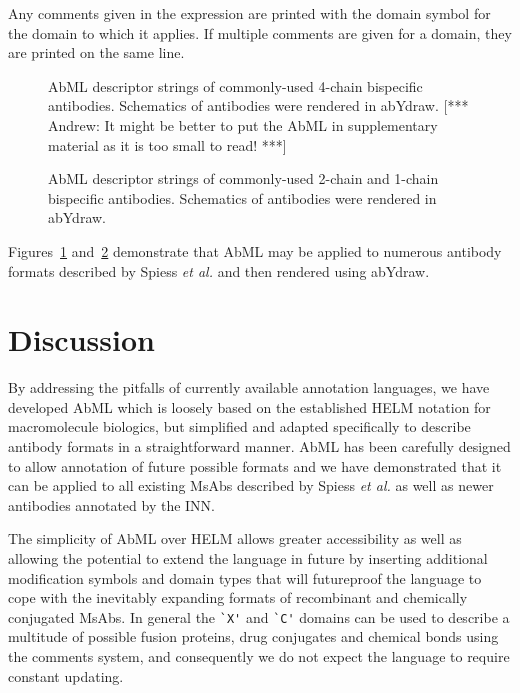 \documentclass[a4]{article}
\newcommand{\etal}{\emph{et al.}}
\newcommand{\andrew}[1]{{\color{red} [*** Andrew: #1 ***]}}
\let\shortcite\cite
\begin{document}
Any
comments given in the expression are printed with the domain symbol for
the domain to which it applies. If multiple comments are
given for a domain, they are printed on the same line. 

\begin{figure}
\caption{\label{fig:2} AbML descriptor strings of commonly-used
4-chain bispecific antibodies. Schematics of antibodies were rendered
in abYdraw. \andrew{It might be better to put the AbML in supplementary
  material as it is too small to read!} }
\end{figure}

\begin{figure}
\caption{\label{fig:3} AbML descriptor strings of commonly-used
2-chain and 1-chain bispecific antibodies. Schematics of antibodies
were rendered in abYdraw.} 
\end{figure}

Figures~\ref{fig:2} and~\ref{fig:3} demonstrate that AbML may be
applied to numerous antibody formats described by Spiess \etal
\shortcite{spiess:2015} and then rendered using abYdraw.

\section{Discussion}

By addressing the pitfalls of currently available annotation languages,
we have developed AbML which is loosely 
based on the established HELM notation for macromolecule
biologics, but simplified and adapted specifically to describe antibody
formats in a straightforward  manner.
AbML has been carefully designed to allow annotation of future possible
formats and we have demonstrated that it can be applied to all existing
MsAbs described by Spiess \etal \shortcite{spiess:2015} as well as
newer antibodies annotated by the INN.

The simplicity of AbML over HELM allows greater accessibility
as well as allowing the potential to extend the language in future by inserting additional modification
symbols and domain types that will futureproof the language to cope
with the inevitably expanding formats of recombinant and chemically
conjugated MsAbs. In general the \verb|`X'| and \verb|`C'|
domains can be used to describe a multitude of possible fusion proteins,
drug conjugates and chemical bonds using the comments system, and consequently
we do not expect the language to require constant updating.
\end{document}
